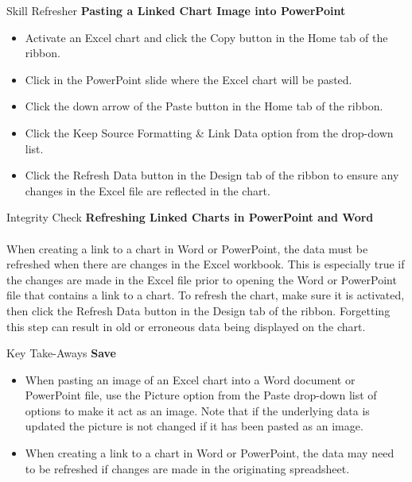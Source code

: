\begin{center}
	\begin{sklbox}{Skill Refresher}
		\textbf{Pasting a Linked Chart Image into PowerPoint}
		\\
		\begin{itemize}
			\setlength{\itemsep}{0pt}
			\setlength{\parskip}{0pt}
			\setlength{\parsep}{0pt}
			
			\item Activate an Excel chart and click the Copy button in the Home tab of the ribbon.
			\item Click in the PowerPoint slide where the Excel chart will be pasted.
			\item Click the down arrow of the Paste button in the Home tab of the ribbon.
			\item Click the Keep Source Formatting \& Link Data option from the drop-down list.
			\item Click the Refresh Data button in the Design tab of the ribbon to ensure any changes in the Excel file are reflected in the chart.
			
		\end{itemize}
	\end{sklbox}
\end{center}

\begin{center}
	\begin{infobox}{Integrity Check}
		\textbf{Refreshing Linked Charts in PowerPoint and Word}
		\\
		\\
		When creating a link to a chart in Word or PowerPoint, the data must be refreshed when there are changes in the Excel workbook. This is especially true if the changes are made in the Excel file prior to opening the Word or PowerPoint file that contains a link to a chart. To refresh the chart, make sure it is activated, then click the Refresh Data button in the Design tab of the ribbon. Forgetting this step can result in old or erroneous data being displayed on the chart.
	\end{infobox}
\end{center}

\begin{center}
	\begin{tkwbox}{Key Take-Aways}
		\textbf{Save}
		\\
		\begin{itemize}
			\setlength{\itemsep}{0pt}
			\setlength{\parskip}{0pt}
			\setlength{\parsep}{0pt}

			\item When pasting an image of an Excel chart into a Word document or PowerPoint file, use the Picture option from the Paste drop-down list of options to make it act as an image. Note that if the underlying data is updated the picture is not changed if it has been pasted as an image.
			\item When creating a link to a chart in Word or PowerPoint, the data may need to be refreshed if changes are made in the originating spreadsheet. 
					
		\end{itemize}
	\end{tkwbox}
\end{center}

